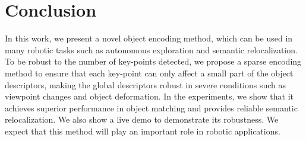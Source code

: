 \documentclass[letterpaper, 10 pt, journal, twoside]{IEEEtran}  %
\begin{document}
\section{Conclusion}

In this work, we present a novel object encoding method, which can be used in many robotic tasks such as autonomous exploration and semantic relocalization.
To be robust to the number of key-points detected, we propose a sparse encoding method to ensure that each key-point can only affect a small part of the object descriptors, making the global descriptors robust in severe conditions such as viewpoint changes and object deformation.
In the experiments, we show that it achieves superior performance in object matching and provides reliable semantic relocalization.
We also show a live demo to demonstrate its robustness. We expect that this method will play an important role in robotic applications.













{
    \balance
    
    
}
\end{document}

